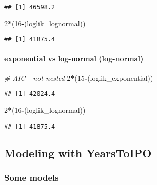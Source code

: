 \documentclass[]{article}
\newenvironment{Shaded}{\begin{snugshade}}{\end{snugshade}}
\newcommand{\CommentTok}[1]{\textcolor[rgb]{0.56,0.35,0.01}{\textit{#1}}}
\newcommand{\DecValTok}[1]{\textcolor[rgb]{0.00,0.00,0.81}{#1}}
\newcommand{\NormalTok}[1]{#1}
\newcommand{\OperatorTok}[1]{\textcolor[rgb]{0.81,0.36,0.00}{\textbf{#1}}}
\let\oldparagraph\paragraph
\renewcommand{\paragraph}[1]{\oldparagraph{#1}\mbox{}}
\begin{document}
\begin{verbatim}
## [1] 46598.2
\end{verbatim}

\begin{Shaded}
\begin{Highlighting}[]
\DecValTok{2}\OperatorTok{*}\NormalTok{(}\DecValTok{16}\OperatorTok{-}\NormalTok{(loglik_lognormal))}
\end{Highlighting}
\end{Shaded}

\begin{verbatim}
## [1] 41875.4
\end{verbatim}

\hypertarget{exponential-vs-log-normal-log-normal}{%
\paragraph{exponential vs log-normal
(log-normal)}\label{exponential-vs-log-normal-log-normal}}

\begin{Shaded}
\begin{Highlighting}[]
\CommentTok{# AIC - not nested }
\DecValTok{2}\OperatorTok{*}\NormalTok{(}\DecValTok{15}\OperatorTok{-}\NormalTok{(loglik_exponential))}
\end{Highlighting}
\end{Shaded}

\begin{verbatim}
## [1] 42024.4
\end{verbatim}

\begin{Shaded}
\begin{Highlighting}[]
\DecValTok{2}\OperatorTok{*}\NormalTok{(}\DecValTok{16}\OperatorTok{-}\NormalTok{(loglik_lognormal))}
\end{Highlighting}
\end{Shaded}

\begin{verbatim}
## [1] 41875.4
\end{verbatim}

\hypertarget{modeling-with-yearstoipo}{%
\subsection{Modeling with YearsToIPO}\label{modeling-with-yearstoipo}}

\hypertarget{some-models}{%
\subsubsection{Some models}\label{some-models}}
\end{document}
